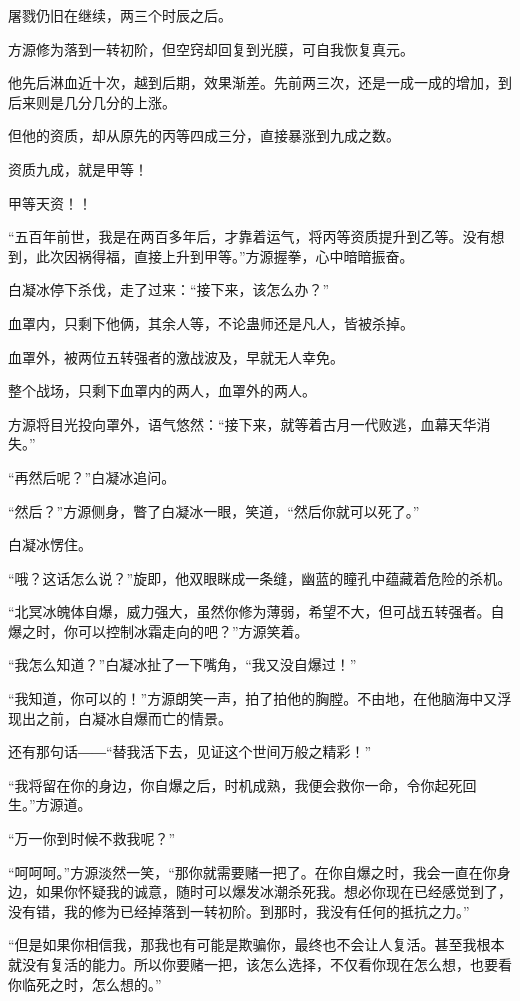 \begin{this_body}
屠戮仍旧在继续，两三个时辰之后。

方源修为落到一转初阶，但空窍却回复到光膜，可自我恢复真元。

他先后淋血近十次，越到后期，效果渐差。先前两三次，还是一成一成的增加，到后来则是几分几分的上涨。

但他的资质，却从原先的丙等四成三分，直接暴涨到九成之数。

资质九成，就是甲等！

甲等天资！！

“五百年前世，我是在两百多年后，才靠着运气，将丙等资质提升到乙等。没有想到，此次因祸得福，直接上升到甲等。”方源握拳，心中暗暗振奋。

白凝冰停下杀伐，走了过来：“接下来，该怎么办？”

血罩内，只剩下他俩，其余人等，不论蛊师还是凡人，皆被杀掉。

血罩外，被两位五转强者的激战波及，早就无人幸免。

整个战场，只剩下血罩内的两人，血罩外的两人。

方源将目光投向罩外，语气悠然：“接下来，就等着古月一代败逃，血幕天华消失。”

“再然后呢？”白凝冰追问。

“然后？”方源侧身，瞥了白凝冰一眼，笑道，“然后你就可以死了。”

白凝冰愣住。

“哦？这话怎么说？”旋即，他双眼眯成一条缝，幽蓝的瞳孔中蕴藏着危险的杀机。

“北冥冰魄体自爆，威力强大，虽然你修为薄弱，希望不大，但可战五转强者。自爆之时，你可以控制冰霜走向的吧？”方源笑着。

“我怎么知道？”白凝冰扯了一下嘴角，“我又没自爆过！”

“我知道，你可以的！”方源朗笑一声，拍了拍他的胸膛。不由地，在他脑海中又浮现出之前，白凝冰自爆而亡的情景。

还有那句话――“替我活下去，见证这个世间万般之精彩！”

“我将留在你的身边，你自爆之后，时机成熟，我便会救你一命，令你起死回生。”方源道。

“万一你到时候不救我呢？”

“呵呵呵。”方源淡然一笑，“那你就需要赌一把了。在你自爆之时，我会一直在你身边，如果你怀疑我的诚意，随时可以爆发冰潮杀死我。想必你现在已经感觉到了，没有错，我的修为已经掉落到一转初阶。到那时，我没有任何的抵抗之力。”

“但是如果你相信我，那我也有可能是欺骗你，最终也不会让人复活。甚至我根本就没有复活的能力。所以你要赌一把，该怎么选择，不仅看你现在怎么想，也要看你临死之时，怎么想的。”


\end{this_body}
